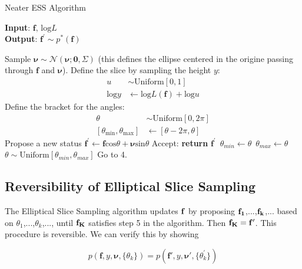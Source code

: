 \documentclass{article}
\begin{document}
\begin{algorithm}
\caption{Neater ESS Algorithm}\label{ess*}
\hspace*{\algorithmicindent} \textbf{Input}: $\mathbf{f},\,\text{log}L$ \\
\hspace*{\algorithmicindent} \textbf{Output}: $\mathbf{f^'}\sim p^*(\mathbf{f})$ 
\begin{algorithmic}[1]
\State Sample $\pmb{\nu}\sim\mathcal{N}(\pmb{\nu};\mathbf{0},\Sigma)$ (this defines the ellipse centered in the origine passing through $\mathbf{f}$ and $\pmb{\nu}$).
\State Define the slice by sampling the height $y$:
\begin{align*}
u &\sim\text{Uniform}[0,1]\\
\text{log}y &\leftarrow \text{log}L(\mathbf{f})+\text{log}u
\end{align*}
\State Define the bracket for the angles:
\begin{align*}
\theta &\sim\text{Uniform}[0,2\pi]\\
[\theta_{\text{min}},\theta_{\text{max}}]&\leftarrow [\theta-2\pi,\theta]
\end{align*}
\State Propose a new status $\mathbf{f^{'}}\leftarrow\mathbf{f}\text{cos}\theta+\pmb{\nu}\text{sin}\theta$
    \State Accept: \textbf{return} $\mathbf{f^{'}}$
     $\,\theta_{min}\leftarrow\theta$ 
    \Else $\,\theta_{max}\leftarrow\theta$
  \State $\theta\sim\text{Uniform}[\theta_{min}, \theta_{max}]$
  \State Go to 4.
\end{algorithmic}
\end{algorithm}


\subsection{Reversibility of Elliptical Slice Sampling}

The Elliptical Slice Sampling algorithm updates $\bf{f}$ by proposing $\bf{f_1}$,...,$\bf{f_k}$,... based on $\theta_1$,...,$\theta_k$,..., until $\bf{f_K}$ satisfies step 5 in the algorithm. Then $\bf{f_K} = \bf{f'}$. This procedure is reversible. We can verify this by showing

\begin{equation}
p(\mathbf{f}, y, \pmb{\nu},\lbrace\theta_k\rbrace)=p(\mathbf{f'}, y, \pmb{\nu'},\lbrace\theta_k^{'}\rbrace)
\end{equation}
\end{document}
